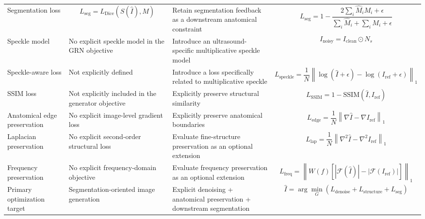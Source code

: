 \documentclass[conference]{IEEEtran}
\begin{document}
\begin{table}[t]
\begin{tabularx}{\textwidth}{
    >{\raggedright\arraybackslash}m{}
    >{\raggedright\arraybackslash}m{}
    >{\raggedright\arraybackslash}m{}
    >{\raggedright\arraybackslash}X
}
Segmentation loss
&
\[
L_{\mathrm{seg}}
=
L_{\mathrm{Dice}}
\left(
S(\hat I),M
\right)
\]
&
Retain segmentation feedback as a downstream anatomical constraint
&
\[
L_{\mathrm{seg}}
=
1-
\frac{
2\sum_i\hat M_iM_i+\epsilon
}{
\sum_i\hat M_i+\sum_iM_i+\epsilon
}
\]
\\

Speckle model
&
No explicit speckle model in the GRN objective
&
Introduce an ultrasound-specific multiplicative speckle model
&
\[
I_{\mathrm{noisy}}
=
I_{\mathrm{clean}}
\odot N_s
\]
\\

Speckle-aware loss
&
Not explicitly defined
&
Introduce a loss specifically related to multiplicative speckle
&
\[
L_{\mathrm{speckle}}
=
\frac{1}{N}
\left\|
\log(\hat I+\epsilon)
-
\log(I_{\mathrm{ref}}+\epsilon)
\right\|_1
\]
\\

SSIM loss
&
Not explicitly included in the generator objective
&
Explicitly preserve structural similarity
&
\[
L_{\mathrm{SSIM}}
=
1-
\mathrm{SSIM}
(\hat I,I_{\mathrm{ref}})
\]
\\

Anatomical edge preservation
&
No explicit image-level gradient loss
&
Explicitly preserve anatomical boundaries
&
\[
L_{\mathrm{edge}}
=
\frac{1}{N}
\left\|
\nabla\hat I
-
\nabla I_{\mathrm{ref}}
\right\|_1
\]
\\

Laplacian preservation
&
No explicit second-order structural loss
&
Evaluate fine-structure preservation as an optional extension
&
\[
L_{\mathrm{lap}}
=
\frac{1}{N}
\left\|
\nabla^2\hat I
-
\nabla^2I_{\mathrm{ref}}
\right\|_1
\]
\\

Frequency preservation
&
No explicit frequency-domain objective
&
Evaluate frequency preservation as an optional extension
&
\[
L_{\mathrm{freq}}
=
\left\|
W(f)
\left[
|\mathcal{F}(\hat I)|
-
|\mathcal{F}(I_{\mathrm{ref}})|
\right]
\right\|_1
\]
\\

Primary optimization target
&
Segmentation-oriented image generation
&
Explicit denoising + anatomical preservation + downstream segmentation
&
\[
\hat I
=
\arg\min_G
\left(
L_{\mathrm{denoise}}
+
L_{\mathrm{structure}}
+
L_{\mathrm{seg}}
\right)
\]
\\


\end{tabularx}
\end{table}
\end{document}
